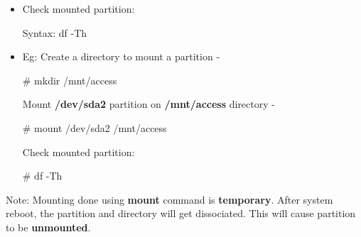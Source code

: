 \begin{flushleft}
\begin{itemize}
		\item Check mounted partition:
		\begin{tcolorbox}[breakable,notitle,boxrule=-0pt,colback=pink,colframe=pink]
			\color{black}
			\font=9pt
			Syntax: df -Th
			\font=4pt
		\end{tcolorbox}
		\bigskip
		\bigskip
		\item Eg: Create a directory to mount a partition -
		\begin{tcolorbox}[breakable,notitle,boxrule=-0pt,colback=black,colframe=black]
			\color{green}
			\font=9pt
			\# mkdir /mnt/access
			\font=4pt
		\end{tcolorbox}
		Mount \textbf{/dev/sda2} partition on \textbf{/mnt/access} directory -
		\begin{tcolorbox}[breakable,notitle,boxrule=-0pt,colback=black,colframe=black]
			\color{green}
			\font=9pt
			\# mount /dev/sda2 /mnt/access
			\font=4pt
		\end{tcolorbox}
		Check mounted partition:
		\begin{tcolorbox}[breakable,notitle,boxrule=-0pt,colback=black,colframe=black]
			\color{green}
			\font=9pt
			\# df -Th
			\font=4pt
		\end{tcolorbox}
		
	\end{itemize}
	\bigskip
	\begin{tcolorbox}[breakable,notitle,boxrule=1pt,colback=yellow,colframe=yellow]
		\color{black}
		Note: Mounting done using \textbf{mount} command is \textbf{temporary}. After system reboot, the partition and directory will get dissociated. This will cause partition to be \textbf{unmounted}.
	\end{tcolorbox}
	
	
	
\end{flushleft}

\newpage

